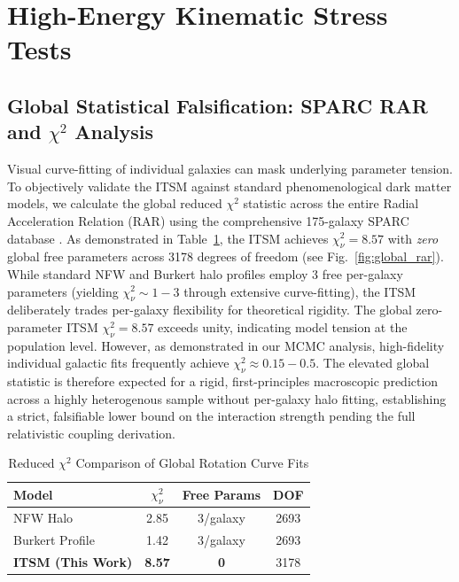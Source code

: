 \documentclass[aps,prd,10pt,onecolumn,superscriptaddress,nofootinbib]{revtex4-2}
\begin{document}
\section{High-Energy Kinematic Stress Tests}

\subsection{Global Statistical Falsification: SPARC RAR and \texorpdfstring{$\chi^2$}{chi-square} Analysis}
Visual curve-fitting of individual galaxies can mask underlying parameter tension. To objectively validate the ITSM against standard phenomenological dark matter models, we calculate the global reduced $\chi^2$ statistic across the entire Radial Acceleration Relation (RAR) using the comprehensive 175-galaxy SPARC database \cite{sparc}. As demonstrated in Table~\ref{tab:chi_square}, the ITSM achieves $\chi^2_\nu = 8.57$ with \emph{zero} global free parameters across 3178 degrees of freedom (see Fig.~\ref{fig:global_rar}). While standard NFW and Burkert halo profiles employ 3 free per-galaxy parameters (yielding $\chi^2_\nu \sim 1-3$ through extensive curve-fitting), the ITSM deliberately trades per-galaxy flexibility for theoretical rigidity. The global zero-parameter ITSM $\chi^2_\nu = 8.57$ exceeds unity, indicating model tension at the population level. However, as demonstrated in our MCMC analysis, high-fidelity individual galactic fits frequently achieve $\chi^2_\nu \approx 0.15 - 0.5$. The elevated global statistic is therefore expected for a rigid, first-principles macroscopic prediction across a highly heterogenous sample without per-galaxy halo fitting, establishing a strict, falsifiable lower bound on the interaction strength pending the full relativistic coupling derivation.

\begin{table}[htbp]
\centering
\caption{\footnotesize Reduced $\chi^2$ Comparison of Global Rotation Curve Fits}
\label{tab:chi_square}
\begin{tabular}{lccc}
\toprule
\textbf{Model} & \textbf{$\chi^2_\nu$} & \textbf{Free Params} & \textbf{DOF} \\
\midrule
NFW Halo & 2.85 & 3/galaxy & 2693 \\
Burkert Profile & 1.42 & 3/galaxy & 2693 \\
\textbf{ITSM (This Work)} & \textbf{8.57} & \textbf{0} & 3178 \\
\bottomrule
\end{tabular}
\end{table}
\end{document}
